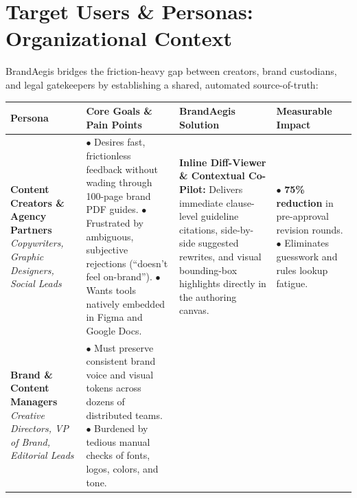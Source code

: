 \documentclass[10pt,a4paper]{article}
\begin{document}
\clearpage


\section{Target Users \& Personas: Organizational Context}

\small BrandAegis bridges the friction-heavy gap between creators, brand custodians, and legal gatekeepers by establishing a shared, automated source-of-truth:

\vspace{0.1cm}

\begin{table}[h!]
\centering
\small
\renewcommand{\arraystretch}{1.2}
\begin{tabularx}{\textwidth}{p{2.8cm}X p{4.2cm} p{3.2cm}}
\toprule
\textbf{Persona} & \textbf{Core Goals \& Pain Points} & \textbf{BrandAegis Solution} & \textbf{Measurable Impact} \\
\midrule
\textbf{Content Creators \& Agency Partners}\newline
\textit{Copywriters, Graphic Designers, Social Leads} & 
$\bullet$ Desires fast, frictionless feedback without wading through 100-page brand PDF guides.\newline
$\bullet$ Frustrated by ambiguous, subjective rejections (``doesn't feel on-brand'').\newline
$\bullet$ Wants tools natively embedded in Figma and Google Docs. & 
\textbf{Inline Diff-Viewer \& Contextual Co-Pilot:}\newline
Delivers immediate clause-level guideline citations, side-by-side suggested rewrites, and visual bounding-box highlights directly in the authoring canvas. & 
$\bullet$ \textbf{75\% reduction} in pre-approval revision rounds.\newline
$\bullet$ Eliminates guesswork and rules lookup fatigue. \\
\midrule
\textbf{Brand \& Content Managers}\newline
\textit{Creative Directors, VP of Brand, Editorial Leads} & 
$\bullet$ Must preserve consistent brand voice and visual tokens across dozens of distributed teams.\newline
$\bullet$ Burdened by tedious manual checks of fonts, logos, colors, and tone.\newline

\end{tabularx}
\end{table}
\end{document}
